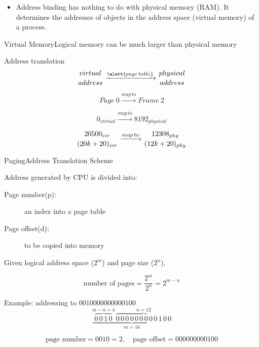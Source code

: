 \begin{itemize}
\item Address binding has nothing to do with physical memory (RAM). It determines the
  addresses of objects in the address space (virtual memory) of a process.
\end{itemize}

\begin{frame}{Virtual Memory}{Logical memory can be much larger than physical memory}
  \begin{varwidth}{.48\textwidth}
    \begin{center}
    \end{center}
  \end{varwidth}\hfill
  \begin{varwidth}{.48\textwidth}
    \begin{block}{Address translation}
      $$\genfrac{}{}{0pt}{}{virtual}{address}
      \xrightarrow{\alert{page\,table}}
      \genfrac{}{}{0pt}{}{physical}{address}$$
      
      $$Page\ 0\xrightarrow{map\,to}Frame\ 2$$
      
      $$0_{virtual}\xrightarrow{map\,to}8192_{physical}$$
      
      $$\genfrac{}{}{0pt}{}{20500_{vir}}{(20k+20)_{vir}}
      \xrightarrow{map\,to} \genfrac{}{}{0pt}{}{12308_{phy}}{(12k+20)_{phy}}$$
    \end{block}
  \end{varwidth}
\end{frame}

\begin{frame}{Paging}{Address Translation Scheme}
  \begin{block}{Address generated by CPU is divided into:}
    \begin{description}
    \item[Page number(p):] an index into a page table
    \item[Page offset(d):] to be copied into memory
    \end{description}
  \end{block}
  Given \alert{logical address space} ($2^m$) and \alert{page size} ($2^n$),
  \begin{small}
    $$\text{number of pages}=\frac{2^m}{2^n}=2^{m-n}$$
  \end{small}
  \begin{block}{Example: addressing to $0010000000000100$}
    $$\underbrace{\overbrace{0\,0\,1\,0}^{m-n=4}\,\overbrace{0\,0\,0\,0\,0\,0\,0\,0\,0\,1\,0\,0}^{n=12}}_{m=16}$$
    \begin{small}
      $$\text{page number}=0010=2, \quad \text{page offset}=000000000100$$
    \end{small}
  \end{block}
\end{frame}

